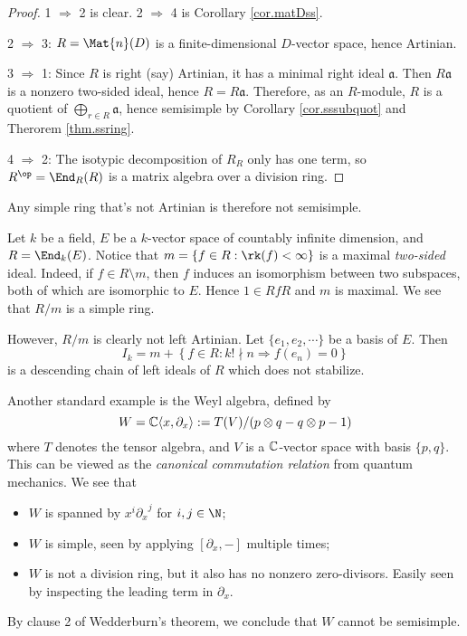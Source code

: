 \documentclass{article}
\begin{document}
\begin{proof}
    1 $\Rightarrow$ 2 is clear. 2 $\Rightarrow$ 4 is Corollary \ref{cor.matDss}.

    2 $\Rightarrow$ 3: $R=\Mat{n}(D)$ is a finite-dimensional $D$-vector space, hence Artinian.

    3 $\Rightarrow$ 1: Since $R$ is right (say) Artinian, it has a minimal right ideal $\mathfrak{a}$.
    Then $R\mathfrak{a}$ is a nonzero two-sided ideal, hence $R=R\mathfrak{a}$.
    Therefore, as an $R$-module, $R$ is a quotient of $\bigoplus_{r\in R}\mathfrak{a}$, hence semisimple by Corollary \ref{cor.sssubquot} and Therorem \ref{thm.ssring}.

    4 $\Rightarrow$ 2: The isotypic decomposition of $R_R$ only has one term, so $R^\op=\End_R(R)$ is a matrix algebra over a division ring.
\end{proof}

\begin{example}
    Any simple ring that's not Artinian is therefore not semisimple.
    
    Let $k$ be a field, $E$ be a $k$-vector space of countably infinite dimension, and $R=\End_k(E)$.
    Notice that $m=\{f\in R:\rk(f)<\infty\}$ is a maximal \emph{two-sided} ideal. Indeed, if $f\in R\setminus m$, then $f$ induces an isomorphism between two subspaces, both of which are isomorphic to $E$. Hence $1\in RfR$ and $m$ is maximal. We see that $R/m$ is a simple ring.

    However, $R/m$ is clearly not left Artinian. Let $\{e_1,e_2,\cdots\}$ be a basis of $E$. Then
    \begin{equation*}
        I_k=m+\left\{f\in R:k!\nmid n\Longrightarrow f(e_n)=0\right\}
    \end{equation*}
    is a descending chain of left ideals of $R$ which does not stabilize.
\end{example}

\begin{example}
    Another standard example is the Weyl algebra, defined by
    \begin{equation*}
        W = \mathbb{C}\langle x,\partial_x\rangle := T(V)/(p\otimes q-q\otimes p-1)
    \end{equation*}
    where $T$ denotes the tensor algebra, and $V$ is a $\mathbb{C}$-vector space with basis $\{p,q\}$. This can be viewed as the \emph{canonical commutation relation} from quantum mechanics. We see that
    \begin{itemize}[nosep]
        \item $W$ is spanned by $x^i{\partial_x}^j$ for $i,j\in\N$;
        \item $W$ is simple, seen by applying $[\partial_x,-]$ multiple times;
        \item $W$ is not a division ring, but it also has no nonzero zero-divisors. Easily seen by inspecting the leading term in $\partial_x$.
    \end{itemize}
    By clause 2 of Wedderburn's theorem, we conclude that $W$ cannot be semisimple.
\end{example}
\end{document}
